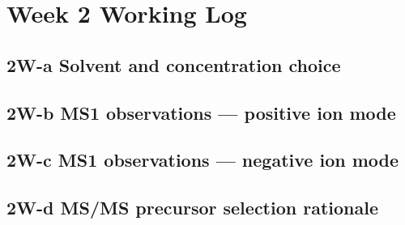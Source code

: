 
\clearpage
\section*{Week 2 Working Log}
\thispagestyle{empty}

\subsection*{2W-a \quad Solvent and concentration choice}

\vspace{6cm}

\subsection*{2W-b \quad MS1 observations — positive ion mode}

\vspace{6cm}

\subsection*{2W-c \quad MS1 observations — negative ion mode}

\vspace{6cm}

\subsection*{2W-d \quad MS/MS precursor selection rationale}

